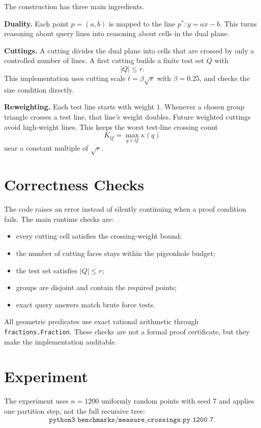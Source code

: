 \documentclass[10pt,a4paper]{article}
\begin{document}
The construction has three main ingredients.

\textbf{Duality.} Each point $p=(a,b)$ is mapped to the line
$p^*:y=ax-b$. This turns reasoning about query lines into reasoning
about cells in the dual plane.

\textbf{Cuttings.} A cutting divides the dual plane into cells that
are crossed by only a controlled number of lines. A first cutting
builds a finite test set $Q$ with
\[
  |Q|\le r.
\]
This implementation uses cutting scale $t=\beta\sqrt r$ with
$\beta=0.25$, and checks the size condition directly.

\textbf{Reweighting.} Each test line starts with weight $1$. Whenever
a chosen group triangle crosses a test line, that line's weight
doubles. Future weighted cuttings avoid high-weight lines. This keeps
the worst test-line crossing count
\[
  K_Q=\max_{q\in Q}\kappa(q)
\]
near a constant multiple of $\sqrt r$.

\section*{Correctness Checks}

The code raises an error instead of silently continuing when a proof
condition fails. The main runtime checks are:

\begin{itemize}
  \item every cutting cell satisfies the crossing-weight bound;
  \item the number of cutting faces stays within the pigeonhole budget;
  \item the test set satisfies $|Q|\le r$;
  \item groups are disjoint and contain the required points;
  \item exact query answers match brute force tests.
\end{itemize}

All geometric predicates use exact rational arithmetic through
\texttt{fractions.Fraction}. These checks are not a formal proof
certificate, but they make the implementation auditable.

\section*{Experiment}

The experiment uses $n=1200$ uniformly random points with seed 7 and
applies one partition step, not the full recursive tree:
\[
  \texttt{python3 benchmarks/measure\_crossings.py 1200 7}.
\]
\end{document}
